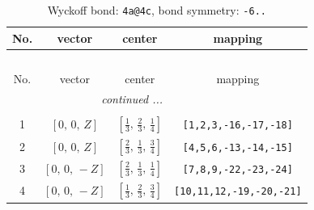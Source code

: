 \documentclass[fleqn,8pt]{jsarticle}
\begin{document}
\renewcommand{\arraystretch}{1.2}
\begin{longtable}{cccc}
\caption{Wyckoff bond: {\tt 4a@4c}, bond symmetry: {\tt -6..}}
 \\
 \hline \hline
No. & vector & center & mapping \\ \hline \endfirsthead

\multicolumn{3}{l}{\tablename\ \thetable{}} \\
 \hline \hline
No. & vector & center & mapping \\ \hline \endhead

 \hline \hline
\multicolumn{3}{r}{\footnotesize\it continued ...} \\ \endfoot

 \hline \hline
\multicolumn{3}{r}{} \\ \endlastfoot

1 & $\left[ 0,\, 0,\, Z \right]$ & $\left[ \frac{1}{3},\, \frac{2}{3},\, \frac{1}{4} \right]$ & {\tt [1,2,3,-16,-17,-18]} \\ \hline
2 & $\left[ 0,\, 0,\, Z \right]$ & $\left[ \frac{2}{3},\, \frac{1}{3},\, \frac{3}{4} \right]$ & {\tt [4,5,6,-13,-14,-15]} \\ \hline
3 & $\left[ 0,\, 0,\, - Z \right]$ & $\left[ \frac{2}{3},\, \frac{1}{3},\, \frac{1}{4} \right]$ & {\tt [7,8,9,-22,-23,-24]} \\ \hline
4 & $\left[ 0,\, 0,\, - Z \right]$ & $\left[ \frac{1}{3},\, \frac{2}{3},\, \frac{3}{4} \right]$ & {\tt [10,11,12,-19,-20,-21]} \\
\end{longtable}
\renewcommand{\arraystretch}{1.2}
\end{document}
